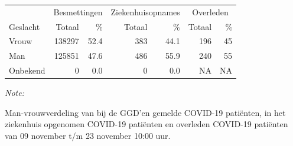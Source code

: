 \documentclass[
  english,
  man,floatsintext]{apa6}
\begin{document}
\begin{table}
\centering\begingroup\fontsize{11}{13}\selectfont

\begin{threeparttable}
\begin{tabular}{lrrrrrr}
\toprule
\multicolumn{1}{c}{ } & \multicolumn{2}{c}{Besmettingen} & \multicolumn{2}{c}{Ziekenhuisopnames} & \multicolumn{2}{c}{Overleden} \\
\cmidrule(l{3pt}r{3pt}){2-3} \cmidrule(l{3pt}r{3pt}){4-5} \cmidrule(l{3pt}r{3pt}){6-7}
Geslacht & Totaal & \% & Totaal & \% & Totaal & \%\\
\midrule
Vrouw & 138297 & 52.4 & 383 & 44.1 & 196 & 45\\
Man & 125851 & 47.6 & 486 & 55.9 & 240 & 55\\
Onbekend & 0 & 0.0 & 0 & 0.0 & NA & NA\\
\bottomrule
\end{tabular}
\begin{tablenotes}
\item \textit{Note: } 
\item Man-vrouwverdeling van bij de GGD’en gemelde COVID-19 patiënten, in het ziekenhuis opgenomen COVID-19 patiënten en overleden COVID-19 patiënten van 09 november t/m 23 november 10:00 uur.
\end{tablenotes}
\end{threeparttable}
\endgroup{}
\end{table}
\newpage
\end{document}
